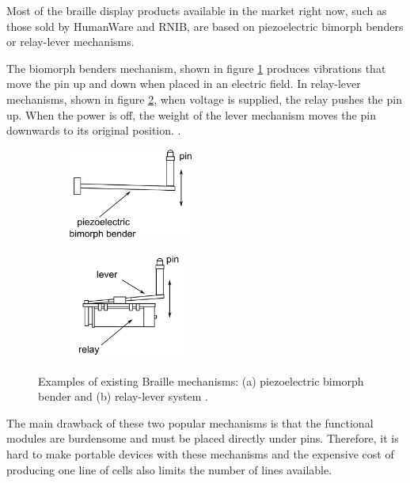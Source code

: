 Most of the braille display products available in the market right now, such as those sold by HumanWare and RNIB, are based on piezoelectric bimorph benders or relay-lever mechanisms.  

The biomorph benders mechanism, shown in figure \ref{fig:piezo-bender} produces vibrations that move the pin up and down when placed in an electric field.
In relay-lever mechanisms, shown in figure \ref{fig:piezo-relay}, when voltage is supplied, the relay pushes the pin up. When the power is off, the weight of the lever mechanism moves the pin downwards to its original position. \cite{hernandez_characterization_2009}.

\begin{figure} \centering
    \begin{subfigure}[b]{0.4\textwidth}\centering
        \includegraphics[height=3cm]{figures/piezo-bender-a.png}
        \caption{}
        \label{fig:piezo-bender}
    \end{subfigure}
    \begin{subfigure}[b]{0.4\textwidth}\centering
        \includegraphics[height=3.5cm]{figures/piezo-bender-b.png}
        \caption{}
        \label{fig:piezo-relay}
    \end{subfigure}
\caption{Examples of existing Braille mechanisms: (a) piezoelectric bimorph bender and (b) relay-lever system \cite{hernandez_characterization_2009}.}
\label{fig:piezo-bender-schema}
\end{figure}

The main drawback of these two popular mechanisms is that the functional modules are burdensome and must be placed directly under pins. Therefore, it is hard to make portable devices with these mechanisms and the expensive cost of producing one line of cells also limits the number of lines available. 


